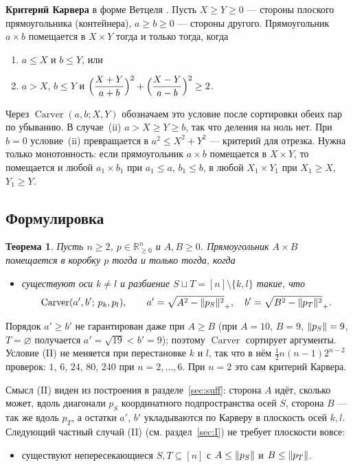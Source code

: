\documentclass[11pt]{article}
\newtheorem{theorem}{Теорема}[section]
\theoremstyle{definition}
\theoremstyle{remark}
\newcommand{\R}{\mathbb{R}}
\newcommand{\Carver}{\operatorname{Carver}}
\DeclarePairedDelimiter{\norm}{\lVert}{\rVert}
\begin{document}
\medskip\noindent\textbf{Критерий Карвера} \cite{Carver1957} в форме Ветцеля \cite[Theorem~1]{Wetzel2000}.
Пусть $X\ge Y\ge0$ --- стороны плоского прямоугольника (контейнера), $a\ge b\ge0$ --- стороны другого.
Прямоугольник $a\times b$ помещается в $X\times Y$ тогда и только тогда, когда
\begin{enumerate}
\item[(i)] $a\le X$ и $b\le Y$, или
\item[(ii)] $a>X$, $b\le Y$ и $\displaystyle\Bigl(\frac{X+Y}{a+b}\Bigr)^2+\Bigl(\frac{X-Y}{a-b}\Bigr)^2\ge2$.
\end{enumerate}
Через $\Carver(a,b;X,Y)$ обозначаем это условие после сортировки обеих пар по убыванию. В случае~(ii)
$a>X\ge Y\ge b$, так что деления на ноль нет. При $b=0$ условие~(ii) превращается в $a^2\le X^2+Y^2$ ---
критерий для отрезка. Нужна только монотонность: если прямоугольник $a\times b$ помещается в $X\times Y$,
то помещается и любой $a_1\times b_1$ при $a_1\le a$, $b_1\le b$, в любой $X_1\times Y_1$ при $X_1\ge X$,
$Y_1\ge Y$.

\subsection{Формулировка}

\begin{theorem}\label{thm:main}
Пусть $n\ge2$, $p\in\R^n_{\ge0}$ и $A,B\ge0$. Прямоугольник $A\times B$ помещается в коробку $p$ тогда и
только тогда, когда
\begin{itemize}
\item[\textbf{(II)}] существуют оси $k\ne l$ и разбиение $S\sqcup T=[n]\setminus\{k,l\}$ такие, что
\[
\Carver(a',b';\,p_k,p_l),\qquad a'=\sqrt{A^2-\norm{p_S}^2}_+,\quad b'=\sqrt{B^2-\norm{p_T}^2}_+ .
\]
\end{itemize}
\end{theorem}

Порядок $a'\ge b'$ не гарантирован даже при $A\ge B$ (при $A=10$, $B=9$, $\norm{p_S}=9$, $T=\varnothing$
получается $a'=\sqrt{19}<b'=9$); поэтому $\Carver$ сортирует аргументы. Условие (II) не меняется при
перестановке $k$ и $l$, так что в нём $\tfrac12 n(n-1)2^{n-2}$ проверок: $1$, $6$, $24$, $80$, $240$ при
$n=2,\dots,6$. При $n=2$ это сам критерий Карвера.

Смысл (II) виден из построения в разделе~\ref{sec:suff}: сторона $A$ идёт, сколько может, вдоль
диагонали $p_S$ координатного подпространства осей $S$, сторона $B$ --- так же вдоль $p_T$, а остатки
$a'$, $b'$ укладываются по Карверу в плоскость осей $k,l$. Следующий частный случай (II) (см.
раздел~\ref{sec:I}) не требует плоскости вовсе:
\begin{itemize}
\item[\textbf{(I)}] существуют непересекающиеся $S,T\subseteq[n]$ с $A\le\norm{p_S}$ и $B\le\norm{p_T}$.
\end{itemize}
\end{document}
